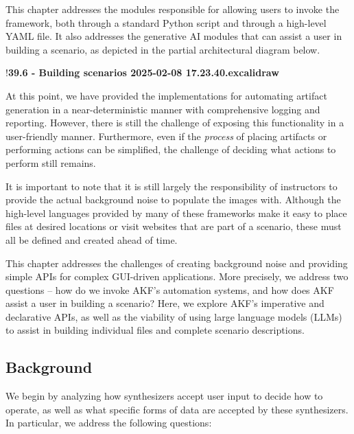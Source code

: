 This chapter addresses the modules responsible for allowing users to
invoke the framework, both through a standard Python script and through
a high-level YAML file. It also addresses the generative AI modules that
can assist a user in building a scenario, as depicted in the partial
architectural diagram below.

!\textbf{39.6 - Building scenarios 2025-02-08 17.23.40.excalidraw}

At this point, we have provided the implementations for automating
artifact generation in a near-deterministic manner with comprehensive
logging and reporting. However, there is still the challenge of exposing
this functionality in a user-friendly manner. Furthermore, even if the
\emph{process} of placing artifacts or performing actions can be
simplified, the challenge of deciding what actions to perform still
remains.

It is important to note that it is still largely the responsibility of
instructors to provide the actual background noise to populate the
images with. Although the high-level languages provided by many of these
frameworks make it easy to place files at desired locations or visit
websites that are part of a scenario, these must all be defined and
created ahead of time.

This chapter addresses the challenges of creating background noise and
providing simple APIs for complex GUI-driven applications. More
precisely, we address two questions -- how do we invoke AKF's automation
systems, and how does AKF assist a user in building a scenario? Here, we
explore AKF's imperative and declarative APIs, as well as the viability
of using large language models (LLMs) to assist in building individual
files and complete scenario descriptions.

\subsection{Background}\label{background}

We begin by analyzing how synthesizers accept user input to decide how
to operate, as well as what specific forms of data are accepted by these
synthesizers. In particular, we address the following questions:


